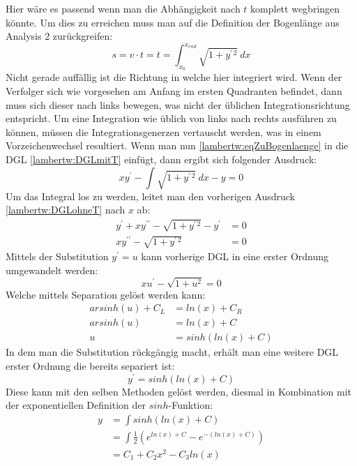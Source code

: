 Hier wäre es passend wenn man die Abhängigkeit nach \(t\) komplett wegbringen könnte. Um dies zu erreichen muss man auf die Definition der Bogenlänge aus Analysis 2 zurückgreifen:
\begin{equation}
	s
	= 
	v \cdot t
	=
	t
	=
	\int_{x_0}^{x_{end}}\sqrt{1+y^{\prime\, 2}} \: dx
	\label{lambertw:eqZuBogenlaenge}
\end{equation}
Nicht gerade auffällig ist die Richtung in welche hier integriert wird. Wenn der Verfolger sich wie vorgesehen am Anfang im ersten Quadranten befindet, dann muss sich dieser nach links bewegen, was nicht der üblichen Integrationsrichtung entspricht. Um eine Integration wie üblich von links nach rechts ausführen zu können, müssen die Integrationsgenerzen vertauscht werden, was in einem Vorzeichenwechsel resultiert. Wenn man nun \eqref{lambertw:eqZuBogenlaenge} in die DGL \eqref{lambertw:DGLmitT} einfügt, dann ergibt sich folgender Ausdruck:
\begin{equation}
	x y^{\prime} - \int\sqrt{1+y^{\prime\, 2}} \: dx - y
	= 0
	\label{lambertw:DGLohneT}
\end{equation}
Um das Integral los zu werden, leitet man den vorherigen Ausdruck \eqref{lambertw:DGLohneT} nach \(x\) ab:
\begin{align*}
	y^{\prime}+ xy^{\prime\prime} - \sqrt{1+y^{\prime\, 2}} - y^{\prime}
	&= 0 \\
	xy^{\prime\prime} - \sqrt{1+y^{\prime\, 2}}
	&= 0
\end{align*}
Mittels der Substitution \(y^{\prime} = u\) kann vorherige DGL in eine erster Ordnung umgewandelt werden:
\begin{equation*}
	xu^{\prime} - \sqrt{1+u^2}
	= 0
	\label{lambertw:DGLmitU}
\end{equation*}
Welche mittels Separation gelöst werden kann:
\begin{align*}
	arsinh(u) + C_L
	&=
	ln(x) + C_R \\
	arsinh(u)
	&=
	ln(x) + C \\
	u
	&=
	sinh(ln(x) + C)
\end{align*}
In dem man die Substitution rückgängig macht, erhält man eine weitere DGL erster Ordnung die bereits separiert ist:
\begin{equation}
	y^{\prime}
	=
	sinh(ln(x) + C)
\end{equation}
Diese kann mit den selben Methoden gelöst werden, diesmal in Kombination mit der exponentiellen Definition der \(sinh\)-Funktion:
\begin{align*}
	y
	&=
	\int sinh(ln(x) + C) \\
	&=
	\int \frac{1}{2} (e^{ln(x)+C} - e^{-(ln(x)+C)}) \\
	&=
	C_1 + C_2 x^2 - C_3 ln(x)
\end{align*}
